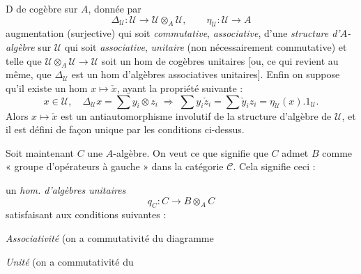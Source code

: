 \documentclass[11pt,a4paper]{article}
\begin{document}
D\ill{} de cogèbre  sur $A$, \struck{\ill{}} donnée
par
\[
\Delta_{\mathcal{U}} : \mathcal{U} \longrightarrow \mathcal{U} \otimes_A \mathcal{U},
\qquad
\eta_{\mathcal{U}} : \mathcal{U} \longrightarrow A
\]
augmentation (surjective)
  \struck{\ill{}} \struck{\ill{}} \struck{\ill{}} \struck{\ill{}}     \struck{\ill{}}
qui soit \emph{commutative}, \emph{associative}, d'une \emph{structure
d'$A$-algèbre} sur $\mathcal{U}$ qui soit \emph{associative},
\emph{unitaire} (non nécessairement commutative) et telle que
$\mathcal{U} \otimes_A \mathcal{U} \to \mathcal{U}$ soit un hom de cogèbres
unitaires [ou, ce qui revient au même, que $\Delta_{\mathcal{U}}$ est un hom
d'algèbres associatives unitaires]. Enfin on suppose qu'il existe un hom
 $x \mapsto \check{x}$, ayant la propriété
suivante :
\[
x \in \mathcal{U}, \quad \Delta_{\mathcal{U}} x = \sum y_i \otimes z_i
\;\Longrightarrow\;
\sum y_i \check{z}_i = \sum \check{y}_i z_i = \eta_{\mathcal{U}}(x) . 1_{\mathcal{U}} .
\]
Alors $x \mapsto \check{x}$ est un antiautomorphisme involutif de la
structure d'algèbre de $\mathcal{U}$, et \struck{\ill{}} il est défini de
façon unique par les conditions ci-dessus.

Soit maintenant $C$ une $A$-algèbre. On veut  ce que
signifie que $C$ admet $B$ comme « groupe d'opérateurs à 
gauche » dans la catégorie $\mathcal{C}$. Cela signifie ceci :


 un \emph{hom. d'algèbres unitaires}
\[
q_C : C \longrightarrow B \otimes_A C
\]
satisfaisant aux conditions suivantes :

\emph{Associativité} (on a commutativité du diagramme


\emph{Unité} (on a commutativité du
\end{document}
